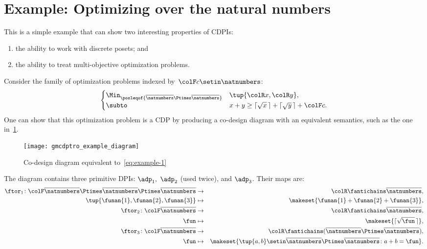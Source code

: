 \section{Example: Optimizing over the natural numbers}

This is a simple example that can show two interesting properties of CDPIs:
\begin{enumerate}
    \item the ability to work with discrete posets; and
    \item the ability to treat multi-objective optimization problems.
\end{enumerate}
Consider the family of optimization problems indexed by~${\colF c}\setin\natnumbers$:
%
\begin{equation}
    \begin{cases}
        \Min_{\posleqof{\overline{\natnumbers}\Ptimes\overline{\natnumbers}}} & \tup{{\colR x},{\colR y}},                                      \\
        \subto                                                                & x+y\geq\lceil\sqrt{x}\,\rceil+\lceil\sqrt{y}\,\rceil+{\colF c}.
    \end{cases}\label{eq:example-1}
\end{equation}
%
One can show that this optimization problem is a CDP by producing a co-design diagram with an equivalent semantics, such as the one in~\cref{fig:toydiagram}.

\begin{figure}[h]
    \centering
    \texttt{[image: gmcdptro\_example\_diagram]}
    \caption{Co-design diagram equivalent to~\cref{eq:example-1}}
    \label{fig:toydiagram}
\end{figure}

The diagram contains three primitive DPIs: $\adp_{1},$ $\adp_{2}$ (used twice), and $\adp_{3}$.
Their \ftor maps are:
\begin{eqnarray*}
    \ftor_{1}\colon {\colF\overline{\natnumbers}\Ptimes\overline{\natnumbers}\Ptimes\overline{\natnumbers}} & \to & {\colR\fantichains\overline{\natnumbers}},\\
    \tup{\funan{1},\funan{2},\funan{3}} & \mapsto & \makeset{\funan{1}+\funan{2}+\funan{3}},\\
    \ftor_{2}\colon {\colF\overline{\natnumbers}} & \rightarrow & {\colR\fantichains\overline{\natnumbers}},\\
    \fun& \mapsto & \makeset{\lceil\sqrt{\fun}\,\rceil},\\
    \ftor_{3}\colon{\colF\overline{\natnumbers}} & \rightarrow & {\colR\fantichains(\overline{\natnumbers}\Ptimes\overline{\natnumbers})},\\
    \fun& \mapsto & \makeset{\tup{a,b} \setin\overline{\natnumbers}\Ptimes\overline{\natnumbers}\colon a+b=\fun}.
\end{eqnarray*}


